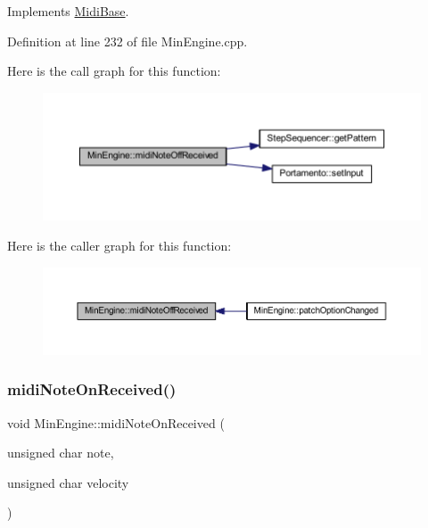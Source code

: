 Implements \hyperlink{class_midi_base_aa26f04b4ead215bce201e480faf7c914}{Midi\+Base}.



Definition at line 232 of file Min\+Engine.\+cpp.

Here is the call graph for this function\+:
\nopagebreak
\begin{figure}[H]
\begin{center}
\leavevmode
\includegraphics[width=350pt]{class_min_engine_aaab036105fa3dce51cc8c8345f2edcfe_cgraph}
\end{center}
\end{figure}
Here is the caller graph for this function\+:
\nopagebreak
\begin{figure}[H]
\begin{center}
\leavevmode
\includegraphics[width=350pt]{class_min_engine_aaab036105fa3dce51cc8c8345f2edcfe_icgraph}
\end{center}
\end{figure}
\mbox{\label{class_min_engine_a108d70cfac8c363fbf6445f679dcf4d5}} 
\subsubsection{\texorpdfstring{midi\+Note\+On\+Received()}{midiNoteOnReceived()}}
{\footnotesize\ttfamily void Min\+Engine\+::midi\+Note\+On\+Received (\begin{DoxyParamCaption}\item[{unsigned char}]{note,  }\item[{unsigned char}]{velocity }\end{DoxyParamCaption})\hspace{0.3cm}{\ttfamily [virtual]}}



